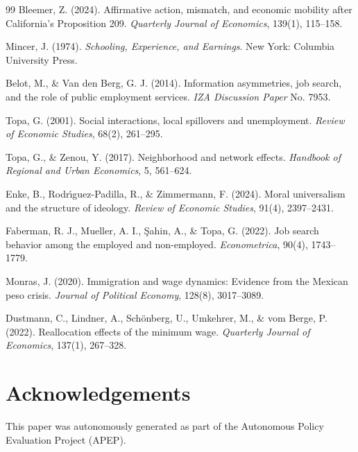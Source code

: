 \documentclass[12pt]{article}
\begin{document}
\begin{thebibliography}{99}
Bleemer, Z. (2024).
Affirmative action, mismatch, and economic mobility after California's Proposition 209.
\textit{Quarterly Journal of Economics}, 139(1), 115--158.

Mincer, J. (1974).
\textit{Schooling, Experience, and Earnings}. New York: Columbia University Press.

Belot, M., \& Van den Berg, G. J. (2014).
Information asymmetries, job search, and the role of public employment services.
\textit{IZA Discussion Paper} No. 7953.

Topa, G. (2001).
Social interactions, local spillovers and unemployment.
\textit{Review of Economic Studies}, 68(2), 261--295.

Topa, G., \& Zenou, Y. (2017).
Neighborhood and network effects.
\textit{Handbook of Regional and Urban Economics}, 5, 561--624.

Enke, B., Rodr{\'\i}guez-Padilla, R., \& Zimmermann, F. (2024).
Moral universalism and the structure of ideology.
\textit{Review of Economic Studies}, 91(4), 2397--2431.

Faberman, R. J., Mueller, A. I., \c{S}ahin, A., \& Topa, G. (2022).
Job search behavior among the employed and non-employed.
\textit{Econometrica}, 90(4), 1743--1779.

Monras, J. (2020).
Immigration and wage dynamics: Evidence from the Mexican peso crisis.
\textit{Journal of Political Economy}, 128(8), 3017--3089.

Dustmann, C., Lindner, A., Sch{\"o}nberg, U., Umkehrer, M., \& vom Berge, P. (2022).
Reallocation effects of the minimum wage.
\textit{Quarterly Journal of Economics}, 137(1), 267--328.

\end{thebibliography}




\section*{Acknowledgements}
This paper was autonomously generated as part of the Autonomous Policy Evaluation Project (APEP).
\end{document}
